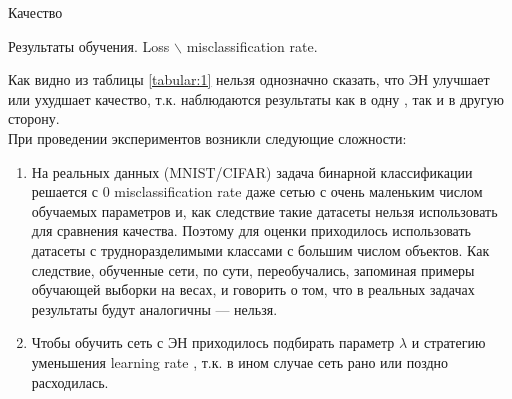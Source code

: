 \documentclass[a4paper,12pt,titlepage,finall]{article}
\begin{document}
\begin{section}{Качество}
\begin{table}[H]
\begin{center}
		\caption{\label{tabular:1} Результаты обучения. Loss $\backslash$ misclassification rate.}
	\end{center}
\end{table}
	Как видно из таблицы \ref{tabular:1} нельзя однозначно сказать, что ЭН улучшает или ухудшает качество, т.к. наблюдаются результаты как в одну , так и в другую сторону.\\
	\linebreak
	При проведении экспериментов возникли следующие сложности:
	\begin{enumerate}
		\item На реальных данных (MNIST/CIFAR) задача бинарной классификации решается с 0 misclassification rate даже сетью с очень маленьким числом обучаемых параметров и, как следствие такие датасеты нельзя использовать для сравнения качества. Поэтому для оценки приходилось использовать датасеты с трудноразделимыми классами с большим числом объектов. Как следствие, обученные сети, по сути, переобучались, запоминая примеры обучающей выборки на весах, и говорить о том, что в реальных задачах результаты будут аналогичны --- нельзя.
		\item Чтобы обучить сеть с ЭН приходилось подбирать параметр $\lambda$ и стратегию уменьшения learning rate , т.к. в ином случае сеть рано или поздно расходилась.
	\end{enumerate}
\end{section}
\end{document}
